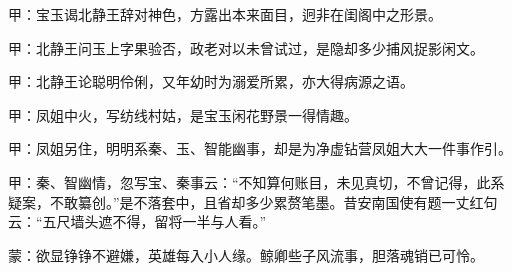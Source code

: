 

\begin{parag}
    \begin{note}甲：宝玉谒北静王辞对神色，方露出本来面目，迥非在闺阁中之形景。\end{note}
\end{parag}


\begin{parag}
    \begin{note}甲：北静王问玉上字果验否，政老对以未曾试过，是隐却多少捕风捉影闲文。\end{note}
\end{parag}


\begin{parag}
    \begin{note}甲：北静王论聪明伶俐，又年幼时为溺爱所累，亦大得病源之语。\end{note}
\end{parag}


\begin{parag}
    \begin{note}甲：凤姐中火，写纺线村姑，是宝玉闲花野景一得情趣。\end{note}
\end{parag}


\begin{parag}
    \begin{note}甲：凤姐另住，明明系秦、玉、智能幽事，却是为净虚钻营凤姐大大一件事作引。\end{note}
\end{parag}


\begin{parag}
    \begin{note}甲：秦、智幽情，忽写宝、秦事云：“不知算何账目，未见真切，不曾记得，此系疑案，不敢纂创。”是不落套中，且省却多少累赘笔墨。昔安南国使有题一丈红句云：“五尺墙头遮不得，留将一半与人看。”\end{note}
\end{parag}


\begin{parag}
    \begin{note}蒙：欲显铮铮不避嫌，英雄每入小人缘。鲸卿些子风流事，胆落魂销已可怜。\end{note}
\end{parag}


